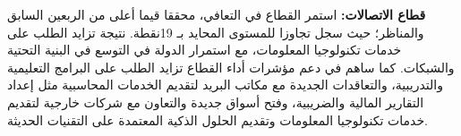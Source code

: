 \textbf{قطاع الاتصالات:} استمر القطاع في التعافي، محققا قيما أعلى من الربعين السابق والمناظر؛ حيث سجل تجاوزا للمستوى المحايد بـ 19نقطة. نتيجة تزايد الطلب على خدمات تكنولوجيا المعلومات، مع استمرار الدولة في التوسع في البنية التحتية والشبكات. كما ساهم في دعم مؤشرات أداء القطاع تزايد الطلب على البرامج التعليمية والتدريبية، والتعاقدات الجديدة مع مكاتب البريد لتقديم الخدمات المحاسبية مثل إعداد التقارير المالية والضريبية، وفتح أسواق جديدة والتعاون مع شركات خارجية لتقديم خدمات تكنولوجيا المعلومات وتقديم الحلول الذكية المعتمدة على التقنيات الحديثة.
